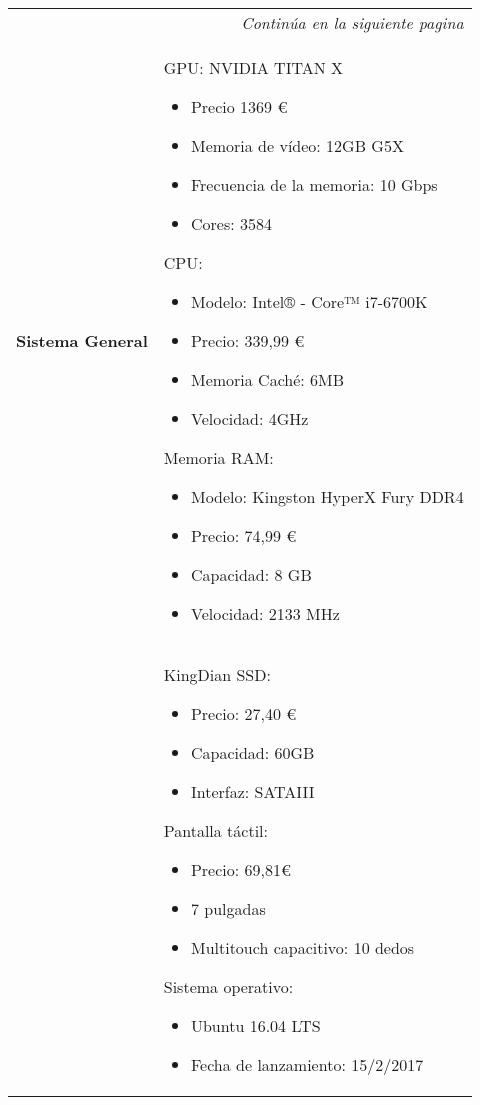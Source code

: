 \begin{center}
\begin{longtable}{p{5cm} p{8cm}}

\hline
\endfirsthead
\hline
\endhead

\hline \multicolumn{2}{r}{\textit{Continúa en la siguiente pagina}} \\
\endfoot
\endlastfoot

\textbf{Sistema General} &
GPU: NVIDIA TITAN X
\begin{itemize}
    \item Precio 1369 \euro
    \item Memoria de vídeo: 12GB G5X
    \item Frecuencia de la memoria: 10 Gbps
    \item Cores: 3584

\end{itemize}
CPU:
\begin{itemize}
    \item Modelo: Intel® - Core™ i7-6700K
    \item Precio: 339,99 \euro
    \item Memoria Caché: 6MB
    \item Velocidad: 4GHz
\end{itemize}
Memoria RAM:
\begin{itemize}
    \item Modelo: Kingston HyperX Fury DDR4
    \item  Precio: 74,99 \euro
    \item  Capacidad: 8 GB
    \item  Velocidad: 2133 MHz
\end{itemize}
\\ &
KingDian SSD:
\begin{itemize}
    \item Precio: 27,40 \euro
    \item Capacidad: 60GB
    \item Interfaz: SATAIII
\end{itemize}
Pantalla táctil:
\begin{itemize}
    \item Precio: 69,81\euro
    \item 7 pulgadas
    \item Multitouch capacitivo: 10 dedos
\end{itemize}
Sistema operativo:
\begin{itemize}
    \item Ubuntu 16.04 LTS
    \item Fecha de lanzamiento: 15/2/2017
\end{itemize}


\end{longtable}
\end{center}
